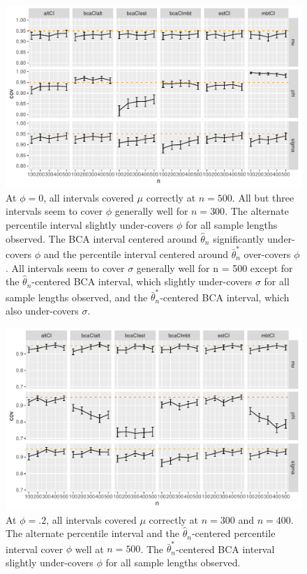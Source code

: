 \documentclass[12pt, letterpaper, titlepage]{article}
\begin{document}
\begin{figure}[tbp]
\caption{}
  \centering
  \includegraphics[width=\textwidth]{figures/plot_0}
  \caption{At $\phi = 0$, all intervals covered $\mu$ correctly at $n = 500$. All but three intervals seem to cover $\phi$ generally well for $n = 300$. The alternate percentile interval slightly under-covers $\phi$ for all sample lengths observed. The BCA interval centered around $\hat{\theta}_{n}$ significantly under-covers $\phi$ and the percentile interval centered around $\bar\theta_n^*$ over-covers $\phi$. All intervals seem to cover $\sigma$ generally well for n = 500 except for the $\hat{\theta}_{n}$-centered BCA interval, which slightly under-covers $\sigma$ for all sample lengths observed, and the  $\bar\theta_n^*$-centered BCA interval, which also under-covers $\sigma$.}
  \label{fig:plot_0}
\end{figure}

\begin{figure}[tbp]
\caption{}
  \centering
  \includegraphics[width=\textwidth]{figures/plot_.2}
  \caption{At $\phi = .2$, all intervals covered $\mu$ correctly at $n = 300$ and $n = 400$. The alternate percentile interval and the $\hat{\theta}_{n}$-centered percentile interval cover $\phi$ well at $n = 500$. The $\bar\theta_n^*$-centered BCA interval slightly under-covers $\phi$ for all sample lengths observed.}
  \label{fig:plot_.2}
\end{figure}
\end{document}
